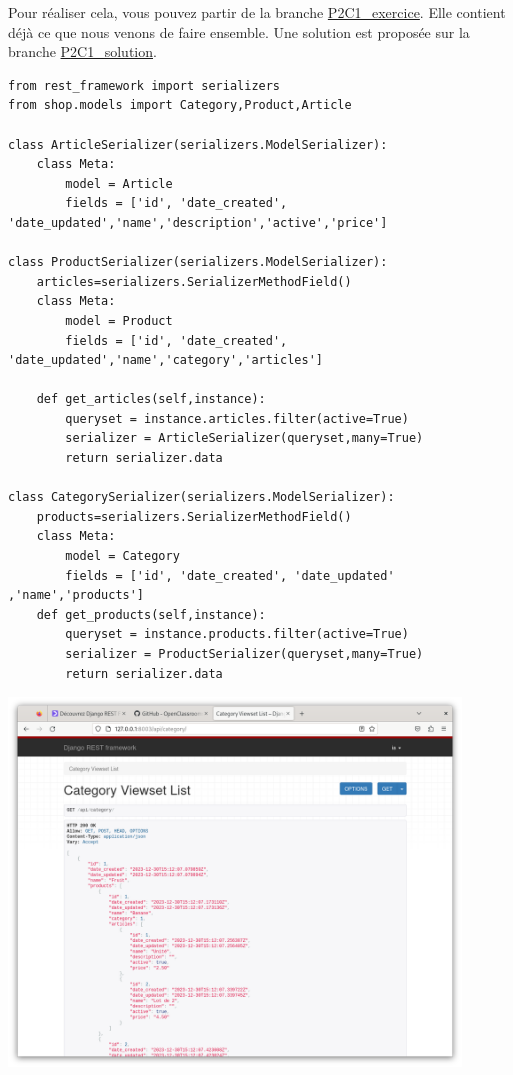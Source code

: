 \documentclass[a4paper]{article}
\begin{document}
Pour réaliser cela, vous pouvez partir de la branche \href{https://github.com/OpenClassrooms-Student-Center/7192416\_APIs\_DRF/tree/P2C1\_exercice}{P2C1\_exercice}. Elle contient déjà ce que nous venons de faire ensemble. Une solution est proposée sur la branche \href{https://github.com/OpenClassrooms-Student-Center/7192416\_APIs\_DRF/tree/P2C1\_solution}{P2C1\_solution}.
\begin{verbatim}
from rest_framework import serializers
from shop.models import Category,Product,Article
 
class ArticleSerializer(serializers.ModelSerializer):
    class Meta:
        model = Article 
        fields = ['id', 'date_created', 'date_updated','name','description','active','price']

class ProductSerializer(serializers.ModelSerializer):
    articles=serializers.SerializerMethodField()
    class Meta:
        model = Product
        fields = ['id', 'date_created', 'date_updated','name','category','articles']  
          
    def get_articles(self,instance):
        queryset = instance.articles.filter(active=True)  
        serializer = ArticleSerializer(queryset,many=True) 
        return serializer.data 
         
class CategorySerializer(serializers.ModelSerializer):
    products=serializers.SerializerMethodField()
    class Meta:
        model = Category
        fields = ['id', 'date_created', 'date_updated' ,'name','products']  
    def get_products(self,instance):
        queryset = instance.products.filter(active=True)  
        serializer = ProductSerializer(queryset,many=True) 
        return serializer.data        
\end{verbatim}
\begin{center}
\includegraphics[width=12cm]{images/image16.png}
\end{center}
\end{document}
